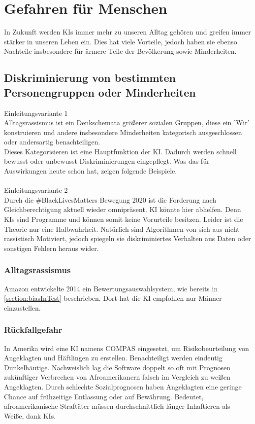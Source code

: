 \documentclass[12pt,oneside,a4paper,parskip]{scrbook}
\begin{document}
\section{Gefahren für Menschen}
In Zukunft werden KIs immer mehr zu unseren Alltag gehören und greifen immer stärker in unseren Leben ein. Dies hat viele Vorteile, jedoch haben sie ebenso Nachteile insbesondere für ärmere Teile der Bevölkerung sowie Minderheiten.
\subsection{Diskriminierung von bestimmten Personengruppen oder Minderheiten}
Einleitungsvariante 1 \\
Alltagsrassismus ist ein Denkschemata größerer sozialen Gruppen, diese ein 'Wir' konstruieren und andere insbesondere Minderheiten kategorisch ausgeschlossen oder andersartig benachteiligen.\\
Dieses Kategorisieren ist eine Hauptfunktion der KI. Dadurch werden schnell bewusst oder unbewusst Diskriminierungen eingepflegt. Was das für Auswirkungen heute schon hat, zeigen folgende Beispiele.
\\\\ Einleitungsvariante 2\\
Durch die \#BlackLivesMatters Bewegung 2020 ist die Forderung nach Gleichberechtigung aktuell wieder omnipräsent. KI könnte hier abhelfen. Denn KIs sind Programme und können somit keine Vorurteile besitzen. Leider ist die Theorie nur eine Halbwahrheit. Natürlich sind Algorithmen von sich aus nicht rassistisch Motiviert, jedoch spiegeln sie diskriminiertes Verhalten aus Daten oder sonstigen Fehlern heraus wider.
\subsubsection{Alltagsrassismus}
Amazon entwickelte 2014 ein Bewertungsauswahlsystem, wie bereits in \ref{section:biasInTest} beschrieben. Dort hat die KI empfohlen nur Männer einzustellen. \\
\subsubsection{Rückfallgefahr}
In Amerika wird eine KI namens COMPAS eingesetzt, um Risikobeurteilung von Angeklagten und Häftlingen zu erstellen. Benachteiligt werden eindeutig Dunkelhäutige. Nachweislich lag die Software doppelt so oft mit Prognosen zukünftiger Verbrechen von Afroamerikanern falsch im Vergleich zu weißen Angeklagten. Durch schlechte Sozialprognosen haben Angeklagten eine geringe Chance auf frühzeitige Entlassung oder auf Bewährung. Bedeutet, afroamerikanische Straftäter müssen durchschnittlich länger Inhaftieren als Weiße, dank KIs.
\end{document}
